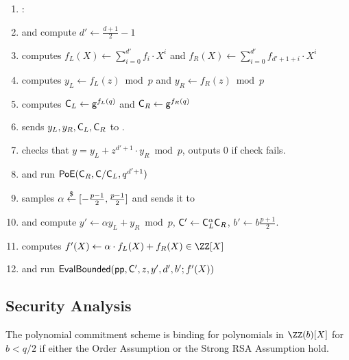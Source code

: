 \begin{small}
\begin{mdframed}
\begin{minipage}{\textwidth}
\begin{enumerate}[nolistsep]
        \item \pcelse: 
       
        \item \pcind[1] \prover and \verifier compute $d' \gets \frac{d+1}{2} - 1$
        \item \pcind[1] \prover computes $f_L(X) \gets \sum\limits_{i=0}^{d'} f_i \cdot X^i$ and $f_R(X)\gets\sum\limits_{i=0}^{d'} f_{d'+1+i}\cdot X^{i}$
        \item \pcind[1] \prover computes $y_L\gets f_L(z) \bmod p$ and $y_R\gets f_R(z)\bmod p$
        \item \pcind[1] \prover computes $\mathsf{C}_L \gets \mathsf{g}^{f_L(q)}$ and $\mathsf{C}_R \gets \mathsf{g}^{f_R(q)}$
        \item \pcind[1] \prover sends $y_L,y_R, \mathsf{C}_L, \mathsf{C}_R$ to \verifier. 
        \item \pcind[1] \verifier checks that $y=y_L+z^{d'+1}\cdot y_R \bmod p$, outputs $0$ if check fails.
        \item \pcind[1] \label{line:PoE} \prover and \verifier run $\textsf{{PoE}}(\mathsf{C}_R, \mathsf{C}/\mathsf{C}_L, q^{d'+1})$
        \item \pcind[1] \verifier samples $\alpha \overset{\$}{\gets} [-\frac{p-1}{2},\frac{p-1}{2}]$ and sends it to \prover
        \item \pcind[1] \prover and \verifier compute $y'\gets\alpha  y_L +y_R \bmod p$, $\mathsf{C}' \gets \mathsf{C}_L^\alpha  \mathsf{C}_R$, $b'\gets b \frac{p+1}{2}$. 
        \item \pcind[1] \prover computes $f'(X) \gets \alpha \cdot f_L(X) + f_R(X) \in \ZZ[X]$ 
        \item \pcind[1] \prover and \verifier run $\textsf{{EvalBounded}}(\textsf{pp}, \mathsf{C}', z, y', d',b' ; f'(X))$
               \end{enumerate}
      \end{minipage}
\end{mdframed}
\end{small}


\begin{comment}
\end{comment}

\subsection{Security Analysis} 
 \newcommand{\bindinglemma}{
 The polynomial commitment scheme is binding for polynomials in $\ZZ(b)[X]$ for $b<q/2$ if either the Order Assumption or the Strong RSA Assumption hold.
	}
\begin{lemma}
\label{lem:binding}
	\bindinglemma
	\end{lemma}

